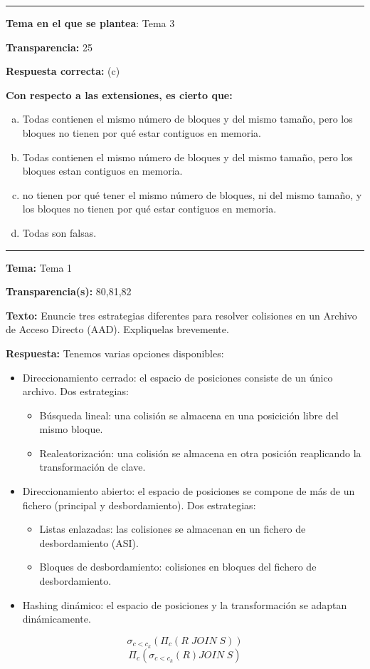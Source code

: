 \documentclass[11pt]{report}
\begin{document}
\hrule

\textbf{Tema en el que se plantea}: Tema 3

\textbf{Transparencia:} 25

\textbf{Respuesta correcta:}  (c)

\textbf{Con respecto a las extensiones, es cierto que: }
\begin{enumerate}[(a)]
\item Todas contienen el mismo número de bloques y del mismo tamaño, pero los bloques no tienen por qué estar contiguos en memoria.
\item Todas contienen el mismo número de bloques y del mismo tamaño, pero los bloques estan contiguos en memoria.
\item  no tienen por qué tener el mismo número de bloques, ni del mismo tamaño, y los bloques no tienen por qué estar contiguos en memoria.
\item Todas son falsas.
\end{enumerate}

\hrule 

\textbf{Tema:} Tema 1

\textbf{Transparencia(s):} 80,81,82 

\textbf{Texto:}  Enuncie tres estrategias diferentes para resolver colisiones en un Archivo de Acceso Directo (AAD). Expliquelas brevemente.

\textbf{Respuesta:} Tenemos varias opciones disponibles:
\begin{itemize}
\item Direccionamiento cerrado: el espacio de posiciones consiste de un único archivo. Dos estrategias:
\begin{itemize}
\item Búsqueda lineal: una colisión se almacena en una posicición libre del mismo bloque.
\item Realeatorización: una colisión se almacena en otra posición reaplicando la transformación de clave.
\end{itemize}
\item Direccionamiento abierto: el espacio de posiciones se compone de más de un fichero (principal y desbordamiento). Dos estrategias:
\begin{itemize}
\item Listas enlazadas: las colisiones se almacenan en un fichero de desbordamiento (ASI).
\item Bloques de desbordamiento: colisiones en bloques del fichero de desbordamiento.
\end{itemize}
\item Hashing dinámico: el espacio de posiciones y la transformación se adaptan dinámicamente.
\end{itemize}

\[
\sigma_{c<c_k}\left(\Pi_c(R\;JOIN\;S)\right)
\]
\[
\Pi_c(\sigma_{c<c_k}(R)JOIN\;S)
\]
\end{document}
